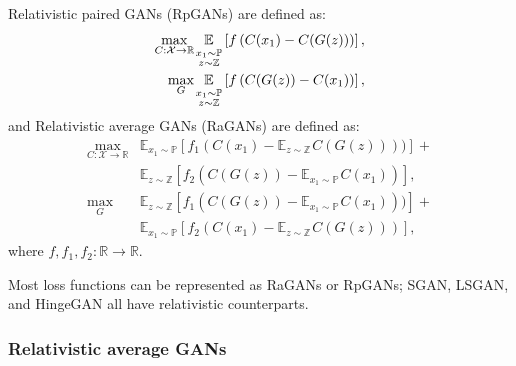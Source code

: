 \documentclass{article}
\begin{document}
Relativistic paired GANs (RpGANs) are defined as:
\begin{align*}
\max\limits_{C:\mathcal{X} \to \mathbb{R}} \hspace{1pt}
&\underset{ \substack{x_1 \sim \mathbb{P}  \\ z \sim \mathbb{Z}}}{\mathbb{E}\vphantom{p}} \left[ f \left( C(x_1) - C(G(z)) \right) \right], \\
\max_{G} \hspace{1pt}&
\underset{ \substack{x_1 \sim \mathbb{P}  \\ z \sim \mathbb{Z}}}{\mathbb{E}\vphantom{p}} \left[ f \left( C(G(z)) - C(x_1) \right) \right],
\end{align*}
and Relativistic average GANs (RaGANs) are defined as:
\begin{align*}
\max\limits_{C:\mathcal{X} \to \mathbb{R}} &\mathbb{E}_{x_1 \sim \mathbb{P}}\left[ f_1\left( C(x_1)-\mathbb{E}_{z \sim \mathbb{Z}} \hspace{1pt} C(G(z)) \right)) \right] + \\ &\mathbb{E}_{z \sim \mathbb{Z}} \left[ f_2 \left( C(G(z))-\mathbb{E}_{x_1 \sim \mathbb{P}} \hspace{1pt} C(x_1) \right) \right], \\
\max_{G}  \hspace{2pt} &\mathbb{E}_{z \sim \mathbb{Z}}\left[ f_1\left( C(G(z))-\mathbb{E}_{x_1 \sim \mathbb{P}} \hspace{1pt} C(x_1) \right)) \right] + \\ &\mathbb{E}_{x_1 \sim \mathbb{P}} \left[ f_2 \left( C(x_1)-\mathbb{E}_{z \sim \mathbb{Z}} \hspace{1pt} C(G(z)) \right) \right],
\end{align*}
where $f, f_1, f_2:\mathbb{R} \to \mathbb{R}$.

Most loss functions can be represented as RaGANs or RpGANs; SGAN, LSGAN, and HingeGAN all have relativistic counterparts.



\subsubsection{Relativistic average GANs}
\end{document}
